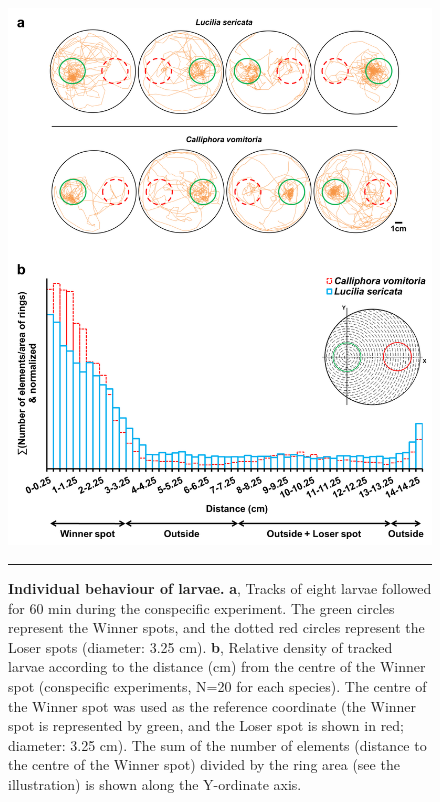 \begin{figure}[p]
\centering
		\includegraphics[width=0.8 \textwidth]{Figures/tracking.png}
		\rule{35em}{0.5pt}
		\caption[Tracking]{\textbf{Individual behaviour of larvae.} \textbf{a}, Tracks of eight larvae followed for 60 min during the conspecific experiment. The green circles represent the Winner spots, and the dotted red circles represent the Loser spots (diameter: 3.25 cm). \textbf{b}, Relative density of tracked larvae according to the distance (cm) from the centre of the Winner spot (conspecific experiments, N=20 for each species). The centre of the Winner spot was used as the reference coordinate (the Winner spot is represented by green, and the Loser spot is shown in red; diameter: 3.25 cm). The sum of the number of elements (distance to the centre of the Winner spot) divided by the ring area (see the illustration) is shown along the Y-ordinate axis.}
	\label{fig:tracking}
\end{figure}

